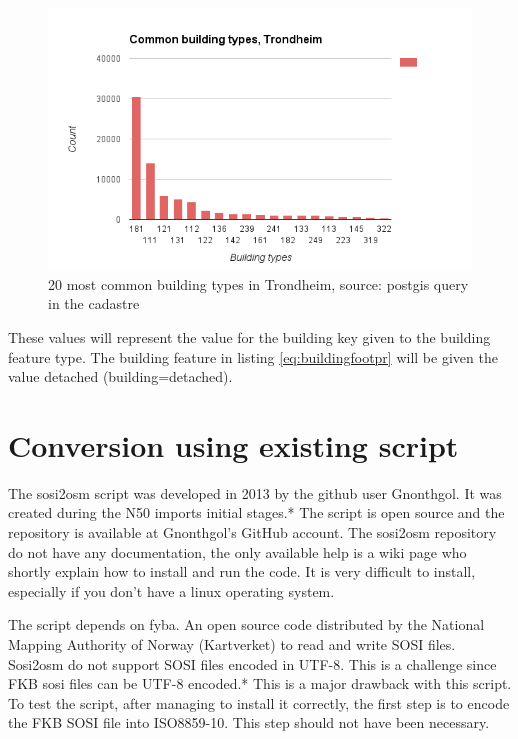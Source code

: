 \begin{figure}[H]
    \centering
    \includegraphics[scale=0.5]{figures/FixedByMe/buildtypestrd.png}
    \caption{20 most common building types in Trondheim, source: postgis query in the cadastre} 
    \label{fig:buildtypTrd}
\end{figure}

These values will represent the value for the building key given to the building feature type. The building feature in listing \ref{eq:buildingfootpr} will be given the value detached (building=detached).  


\section{Conversion using existing script}\label{sec:sosi2osm}

The sosi2osm script was developed in 2013 by the github user Gnonthgol. It was created during the N50 imports initial stages.*%
 The script is open source and the repository is available at Gnonthgol's GitHub account. The sosi2osm repository do not have any documentation, the only available help is a wiki page who shortly explain how to install and run the code. It is very difficult to install, especially if you don't have a linux operating system. 
 
The script depends on fyba. An open source code distributed by the National Mapping Authority of Norway (Kartverket) to read and write SOSI files. Sosi2osm do not support SOSI files encoded in UTF-8. This is a challenge since FKB sosi files can be UTF-8 encoded.*%
 This is a major drawback with this script. To test the script, after managing to install it correctly, the first step is to encode the FKB SOSI file into ISO8859-10. This step should not have been necessary.  %

